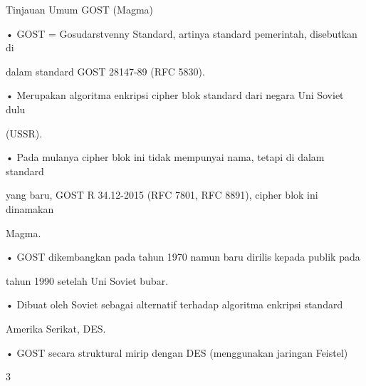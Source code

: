 \documentclass{article}
\begin{document}

Tinjauan Umum GOST (Magma)

• GOST = Gosudarstvenny Standard, artinya standard pemerintah, disebutkan di 

dalam standard GOST 28147-89 (RFC 5830).

• Merupakan algoritma enkripsi cipher blok standard dari negara Uni Soviet dulu 

(USSR).

• Pada mulanya cipher blok ini tidak mempunyai nama, tetapi di dalam standard 

yang baru, GOST R 34.12-2015 (RFC 7801, RFC 8891), cipher blok ini dinamakan 

Magma.

• GOST dikembangkan pada tahun 1970 namun baru dirilis kepada publik pada 

tahun 1990 setelah Uni Soviet bubar. 

• Dibuat oleh Soviet sebagai alternatif terhadap algoritma enkripsi standard 

Amerika Serikat, DES. 

• GOST secara struktural mirip dengan DES  (menggunakan jaringan Feistel)

3
\end{document}
